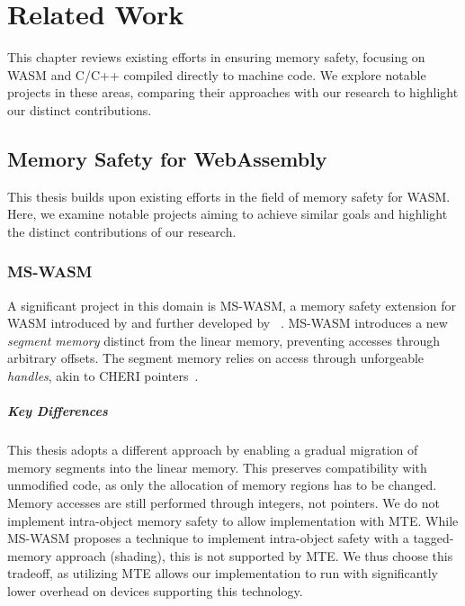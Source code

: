 \chapter{Related Work}
\label{ch:related}

This chapter reviews existing efforts in ensuring memory safety, focusing on \ac{WASM} and C/C++ compiled directly to machine code.
We explore notable projects in these areas, comparing their approaches with our research to highlight our distinct contributions.


\section{Memory Safety for WebAssembly}
\label{sec:related-memory-safety-for-webassembly}

This thesis builds upon existing efforts in the field of memory safety for \ac{WASM}.
Here, we examine notable projects aiming to achieve similar goals and highlight the distinct contributions of our research.

\subsection{MS-WASM}
\label{subsec:ms-wasm}

A significant project in this domain is MS-WASM, a memory safety extension for WASM introduced by \citeauthor*{disselkoen2019position} and further developed by \citeauthor*{michael2023mswasm}~\cite{disselkoen2019position,michael2023mswasm}.
MS-WASM introduces a new \textit{segment memory} distinct from the linear memory, preventing accesses through arbitrary offsets.
The segment memory relies on access through unforgeable \textit{handles}, akin to CHERI pointers~\cite{woodruff2014cheri}.

\paragraph{Key Differences}
This thesis adopts a different approach by enabling a gradual migration of memory segments into the linear memory.
This preserves compatibility with unmodified code, as only the allocation of memory regions has to be changed.
Memory accesses are still performed through integers, not pointers.
We do not implement intra-object memory safety to allow implementation with \ac{MTE}.
While MS-WASM proposes a technique to implement intra-object safety with a tagged-memory approach (shading), this is not supported by \ac{MTE}.
We thus choose this tradeoff, as utilizing \ac{MTE} allows our implementation to run with significantly lower overhead on devices supporting this technology.

